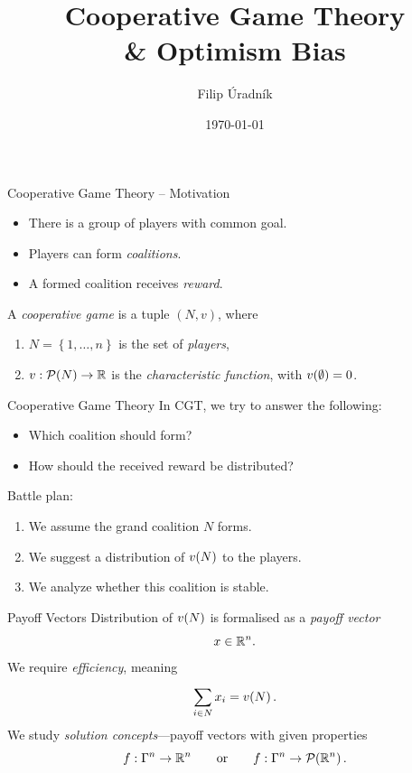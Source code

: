 \documentclass[]{beamer}
\title{Cooperative Game Theory \\ \& Optimism Bias}
\author{Filip Úradník}
\date{\today}
\begin{document}
\maketitle

\begin{frame}{Cooperative Game Theory -- Motivation}
	\begin{itemize}
		\item There is a group of players with common goal.
		\item Players can form \emph{coalitions}.
		\item A formed coalition receives \emph{reward}.
	\end{itemize}
	\vspace{2em}
	\begin{definition}
		A \emph{cooperative game} is a tuple $ \left( N,v \right) $, where \begin{enumerate}
			\item $ N = \left\{ 1, \ldots, n \right\} $ is the set of \emph{players},
			\item $ v: \mathcal{P}\!\left(N\right) \to \mathbb{R} $ is the \emph{characteristic function}, with $ v\!\left(\emptyset\right) = 0 $.
		\end{enumerate}
	\end{definition}
\end{frame}

\begin{frame}{Cooperative Game Theory}
	In CGT, we try to answer the following:
	\begin{itemize}[ ]
		\item Which coalition should form?
		\item How should the received reward be distributed?
	\end{itemize}
	Battle plan:
	\begin{enumerate}
		\item We assume the grand coalition $ N $ forms.
		\item We suggest a distribution of $ v\!\left(N\right) $ to the players.
		\item We analyze whether this coalition is stable.
	\end{enumerate}
\end{frame}

\begin{frame}{Payoff Vectors}
	Distribution of $ v\!\left(N\right) $ is formalised as a \emph{payoff vector}
	\[
		x \in \mathbb{R}^n.
	\]
	We require \emph{efficiency}, meaning \[
		\sum_{i \in N}^{} x_i = v\!\left(N\right).
	\]
	We study \emph{solution concepts}---payoff vectors with given properties \[
		f: \Gamma^n \to {\mathbb{R}^n} \qquad \text{or} \qquad f: \Gamma^n \to \mathcal{P}\!\left(\mathbb{R}^n\right).
	\]
\end{frame}
\end{document}

